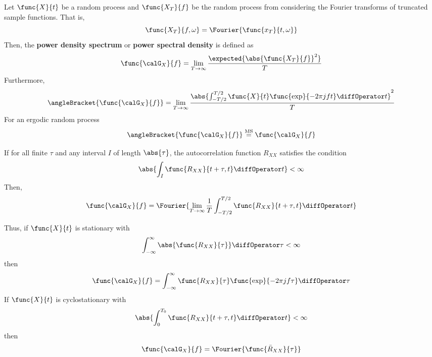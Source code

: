 Let \(\func{X}{t}\) be a random process and \(\func{X_T}{f}\) be the random process from considering the Fourier transforms of truncated sample functions. That is, 
\begin{equation*}
    \func{X_T}{f,\omega} = \Fourier{\func{x_T}{t,\omega}}
\end{equation*}
Then, the \textbf{power density spectrum} or \textbf{power spectral density} is defined as 
\begin{equation*}
    \func{\calG_X}{f} = \lim_{T \to \infty} \dfrac{\expected{\abs{\func{X_T}{f}}^2}}{T}
\end{equation*}
Furthermore,
\begin{equation*}
    \angleBracket{\func{\calG_X}{f}} = \lim_{T \to \infty} \dfrac{\abs{ \int_{-T/2}^{T/2} \func{X}{t} \func{\exp}{-2\pi j ft} \diffOperator t}^2}{T}
\end{equation*}
For an ergodic random process 
\begin{equation*}
    \angleBracket{\func{\calG_X}{f}} \overset{\mathrm{MS}}{=} \func{\calG_X}{f}
\end{equation*}
\begin{theorem}
    If for all finite \(\tau\) and any interval \(I\) of length \(\abs{\tau}\), the autocorrelation function \(R_{XX}\) satisfies the condition 
    \begin{equation*}
        \abs{\int_I \func{R_{XX}}{t + \tau, t} \diffOperator t} < \infty
    \end{equation*}
    Then, 
    \begin{equation*}
        \func{\calG_X}{f} = \Fourier{\lim_{T \to \infty} \dfrac{1}{T} \int_{-T/2}^{T/2} \func{R_{XX}}{t + \tau, t} \diffOperator t}
    \end{equation*}
\end{theorem}
Thus, if \(\func{X}{t}\) is stationary with 
\begin{equation*}
    \int_{-\infty}^{\infty} \abs{\func{R_{XX}}{\tau}} \diffOperator \tau < \infty
\end{equation*}
then 
\begin{equation*}
    \func{\calG_X}{f} = \int_{-\infty}^{\infty} \func{R_{XX}}{\tau} \func{\exp}{-2\pi j f \tau} \diffOperator \tau 
\end{equation*}
If \(\func{X}{t}\) is cyclostationary with 
\begin{equation*}
    \abs{\int_0^{T_0} \func{R_{XX}}{t + \tau , t} \diffOperator t} < \infty 
\end{equation*}
then 
\begin{equation*}
    \func{\calG_X}{f} = \Fourier{\func{\bar{R}_{XX}}{\tau}}
\end{equation*}
